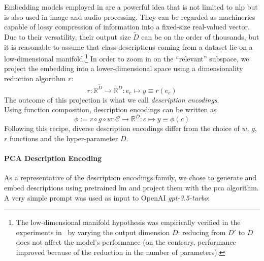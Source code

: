 Embedding models employed in  are a powerful idea that is not limited to \acrshort{nlp} but is also used in image and audio processing.
They can be regarded as machineries capable of lossy compression of information into a fixed-size real-valued vector. Due to their versatility, their output size $\tilde{D}$ can be on the order of thousands, but it is reasonable to assume that class descriptions coming from a dataset lie on a low-dimensional manifold.\footnote{The low-dimensional manifold hypothesis was empirically verified in the experiments in~ by varying the output dimension $D$: reducing from $D'$ to $D$ does not affect the model's performance (on the contrary, performance improved because of the reduction in the number of parameters).}
In order to zoom in on the ``relevant'' subspace, we project the embedding into a lower-dimensional space using a dimensionality reduction algorithm $r$:
\begin{equation}
  r : \mathbb{R}^{\tilde{D}} \to \mathbb{R}^{D} :
  e_c \mapsto y \equiv r(e_c)
  \label{eq:embedding-projection}
\end{equation}
The outcome of this projection is what we call \emph{description encodings}.\\

Using function composition, description encodings can be written as
\begin{equation}
  \phi := r \circ g \circ w : \mathcal{C} \to \mathbb{R}^{D} :
  c \mapsto y \equiv \phi(c)
  \label{eq:desc-encoding}
\end{equation}
Following this recipe, diverse description encodings differ from the choice of $w$, $g$, $r$ functions and the hyper-parameter $D$.

\paragraph{PCA Description Encoding}\label{par:encoding-desc} As a representative of the description encodings family, we chose to generate and embed descriptions using pretrained \acrshort{lm} and project them with the \acrfull{pca} algorithm.
A very simple prompt was used as input to OpenAI \emph{gpt-3.5-turbo}:

\vspace{10pt}

